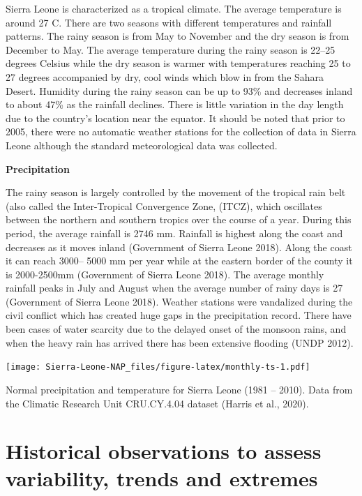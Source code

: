 \documentclass[
]{book}
\begin{document}
Sierra Leone is characterized as a tropical climate. The average temperature is around 27 C. There are two seasons with different temperatures and rainfall patterns. The rainy season is from May to November and the dry season is from December to May. The average temperature during the rainy season is 22--25 degrees Celsius while the dry season is warmer with temperatures reaching 25 to 27 degrees accompanied by dry, cool winds which blow in from the Sahara Desert. Humidity during the rainy season can be up to 93\% and decreases inland to about 47\% as the rainfall declines. There is little variation in the day length due to the country's location near the equator. It should be noted that prior to 2005, there were no automatic weather stations for the collection of data in Sierra Leone although the standard meteorological data was collected.

\textbf{Precipitation}

The rainy season is largely controlled by the movement of the tropical rain belt (also called the Inter-Tropical Convergence Zone, (ITCZ), which oscillates between the northern and southern tropics over the course of a year. During this period, the average rainfall is 2746 mm. Rainfall is highest along the coast and decreases as it moves inland (Government of Sierra Leone 2018). Along the coast it can reach 3000-- 5000 mm per year while at the eastern border of the county it is 2000-2500mm (Government of Sierra Leone 2018). The average monthly rainfall peaks in July and August when the average number of rainy days is 27 (Government of Sierra Leone 2018). Weather stations were vandalized during the civil conflict which has created huge gaps in the precipitation record. There have been cases of water scarcity due to the delayed onset of the monsoon rains, and when the heavy rain has arrived there has been extensive flooding (UNDP 2012).

\texttt{[image: Sierra-Leone-NAP\_files/figure-latex/monthly-ts-1.pdf]}

Normal precipitation and temperature for Sierra Leone (1981 -- 2010). Data from the Climatic Research Unit CRU.CY.4.04 dataset (Harris et al., 2020).

\hypertarget{historical-observations-to-assess-variability-trends-and-extremes}{%
\section{Historical observations to assess variability, trends and extremes}\label{historical-observations-to-assess-variability-trends-and-extremes}}
\end{document}
